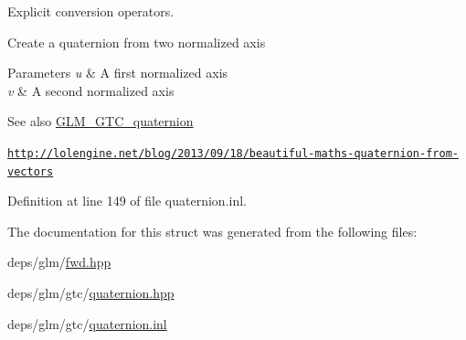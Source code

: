 Explicit conversion operators. 

Create a quaternion from two normalized axis


\begin{DoxyParams}{Parameters}
{\em u} & A first normalized axis \\
\hline
{\em v} & A second normalized axis \\
\hline
\end{DoxyParams}
\begin{DoxySeeAlso}{See also}
\hyperlink{group__gtc__quaternion}{G\+L\+M\+\_\+\+G\+T\+C\+\_\+quaternion} 

\href{http://lolengine.net/blog/2013/09/18/beautiful-maths-quaternion-from-vectors}{\tt http\+://lolengine.\+net/blog/2013/09/18/beautiful-\/maths-\/quaternion-\/from-\/vectors} 
\end{DoxySeeAlso}


Definition at line 149 of file quaternion.\+inl.



The documentation for this struct was generated from the following files\+:\begin{DoxyCompactItemize}
\item 
deps/glm/\hyperlink{fwd_8hpp}{fwd.\+hpp}\item 
deps/glm/gtc/\hyperlink{gtc_2quaternion_8hpp}{quaternion.\+hpp}\item 
deps/glm/gtc/\hyperlink{gtc_2quaternion_8inl}{quaternion.\+inl}\end{DoxyCompactItemize}
